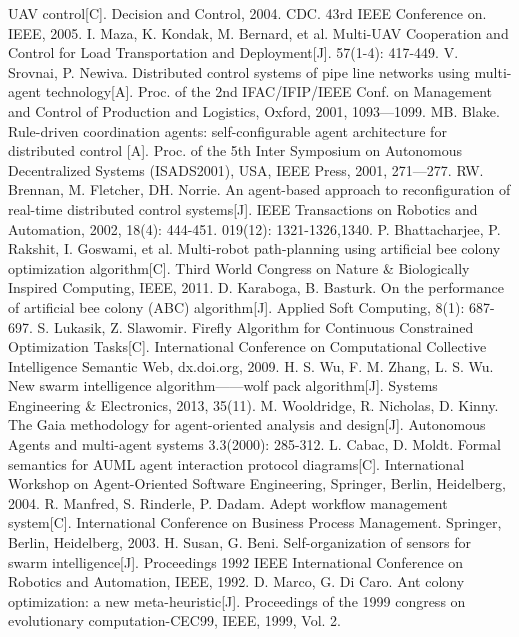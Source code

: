 \documentclass{mcmthesis}
\begin{document}
\begin{thebibliography}{99}
UAV control[C]. Decision and Control, 2004. CDC. 43rd IEEE Conference on. IEEE, 2005.
\bibitem I. Maza, K. Kondak, M. Bernard, et al. Multi-UAV Cooperation and Control for Load
Transportation and Deployment[J]. 57(1-4): 417-449.
\bibitem V. Srovnai, P. Newiva. Distributed control systems of pipe line networks using multi-agent
technology[A]. Proc. of the 2nd IFAC/IFIP/IEEE Conf. on Management and Control of
Production and Logistics, Oxford, 2001, 1093—1099.
\bibitem MB. Blake. Rule-driven coordination agents: self-configurable agent architecture for
distributed control [A]. Proc. of the 5th Inter Symposium on Autonomous Decentralized
Systems (ISADS2001), USA, IEEE Press, 2001, 271—277.
\bibitem RW. Brennan, M. Fletcher, DH. Norrie. An agent-based approach to reconfiguration of
real-time distributed control systems[J]. IEEE Transactions on Robotics and Automation,
2002, 18(4): 444-451.
019(12): 1321-1326,1340.
\bibitem P. Bhattacharjee, P. Rakshit, I. Goswami, et al. Multi-robot path-planning using artificial
bee colony optimization algorithm[C]. Third World Congress on Nature \& Biologically Inspired
Computing, IEEE, 2011.
\bibitem D. Karaboga, B. Basturk. On the performance of artificial bee colony (ABC) algorithm[J].
Applied Soft Computing, 8(1): 687-697.
\bibitem S. Lukasik, Z. Slawomir. Firefly Algorithm for Continuous Constrained Optimization
Tasks[C]. International Conference on Computational Collective Intelligence Semantic Web,
dx.doi.org, 2009.
\bibitem H. S. Wu, F. M. Zhang, L. S. Wu. New swarm intelligence algorithm——wolf pack
algorithm[J]. Systems Engineering \& Electronics, 2013, 35(11).
\bibitem M. Wooldridge, R. Nicholas, D. Kinny. The Gaia methodology for agent-oriented analysis
and design[J]. Autonomous Agents and multi-agent systems 3.3(2000): 285-312.
\bibitem L. Cabac, D. Moldt. Formal semantics for AUML agent interaction protocol
diagrams[C]. International Workshop on Agent-Oriented Software Engineering, Springer,
Berlin, Heidelberg, 2004.
\bibitem R. Manfred, S. Rinderle, P. Dadam. Adept workflow management system[C]. International
Conference on Business Process Management. Springer, Berlin, Heidelberg, 2003.
\bibitem H. Susan, G. Beni. Self-organization of sensors for swarm intelligence[J]. Proceedings
1992 IEEE International Conference on Robotics and Automation, IEEE, 1992.
\bibitem D. Marco, G. Di Caro. Ant colony optimization: a new meta-heuristic[J]. Proceedings of
the 1999 congress on evolutionary computation-CEC99, IEEE, 1999, Vol. 2.
\end{thebibliography}
\end{document}
